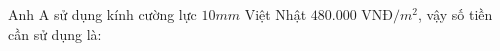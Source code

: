 \documentclass[preview]{standalone}
\begin{document}
\begin{center}
Anh A sử dụng kính cường lực $10 mm$ Việt Nhật $480.000$ VNĐ$/m^2$, vậy số tiền cần sử dụng là:
\end{center}
\end{document}
